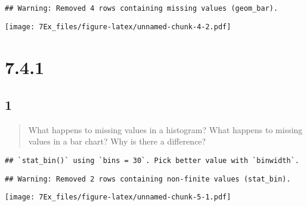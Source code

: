 \documentclass[]{article}
\newenvironment{Shaded}{\begin{snugshade}}{\end{snugshade}}
\newcommand{\DataTypeTok}[1]{\textcolor[rgb]{0.13,0.29,0.53}{#1}}
\newcommand{\DecValTok}[1]{\textcolor[rgb]{0.00,0.00,0.81}{#1}}
\newcommand{\KeywordTok}[1]{\textcolor[rgb]{0.13,0.29,0.53}{\textbf{#1}}}
\newcommand{\NormalTok}[1]{#1}
\newcommand{\OperatorTok}[1]{\textcolor[rgb]{0.81,0.36,0.00}{\textbf{#1}}}
\newcommand{\OtherTok}[1]{\textcolor[rgb]{0.56,0.35,0.01}{#1}}
\newcommand{\StringTok}[1]{\textcolor[rgb]{0.31,0.60,0.02}{#1}}
\begin{document}
\begin{verbatim}
## Warning: Removed 4 rows containing missing values (geom_bar).
\end{verbatim}

\texttt{[image: 7Ex\_files/figure-latex/unnamed-chunk-4-2.pdf]}

\hypertarget{section-5}{%
\section{7.4.1}\label{section-5}}

\hypertarget{section-6}{%
\subsection{1}\label{section-6}}

\begin{quote}
What happens to missing values in a histogram? What happens to missing
values in a bar chart? Why is there a difference?
\end{quote}

\begin{Shaded}
\end{Shaded}

\begin{verbatim}
## `stat_bin()` using `bins = 30`. Pick better value with `binwidth`.
\end{verbatim}

\begin{verbatim}
## Warning: Removed 2 rows containing non-finite values (stat_bin).
\end{verbatim}

\texttt{[image: 7Ex\_files/figure-latex/unnamed-chunk-5-1.pdf]}

\begin{Shaded}
\end{Shaded}
\end{document}
